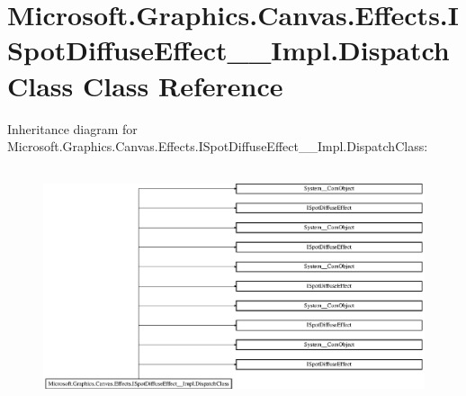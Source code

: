 \hypertarget{class_microsoft_1_1_graphics_1_1_canvas_1_1_effects_1_1_i_spot_diffuse_effect_____impl_1_1_dispatch_class}{}\section{Microsoft.\+Graphics.\+Canvas.\+Effects.\+I\+Spot\+Diffuse\+Effect\+\_\+\+\_\+\+Impl.\+Dispatch\+Class Class Reference}
\label{class_microsoft_1_1_graphics_1_1_canvas_1_1_effects_1_1_i_spot_diffuse_effect_____impl_1_1_dispatch_class}
Inheritance diagram for Microsoft.\+Graphics.\+Canvas.\+Effects.\+I\+Spot\+Diffuse\+Effect\+\_\+\+\_\+\+Impl.\+Dispatch\+Class\+:\begin{figure}[H]
\begin{center}
\leavevmode
\includegraphics[height=6.952596cm]{class_microsoft_1_1_graphics_1_1_canvas_1_1_effects_1_1_i_spot_diffuse_effect_____impl_1_1_dispatch_class}
\end{center}
\end{figure}
